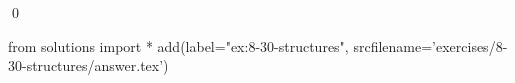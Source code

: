 
\begin{ex}
  \label{ex:8-30-structures}
  
  \qed
\end{ex}
\begin{python0}
from solutions import *
add(label="ex:8-30-structures",
    srcfilename='exercises/8-30-structures/answer.tex')
\end{python0}
